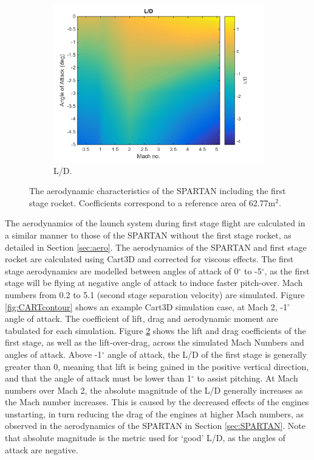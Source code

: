 \begin{figure}[ht]
\begin{subfigure}{.5\textwidth}
    		\centering
    		\includegraphics[width=0.99\linewidth]{figures/3_vehicle_design/FirstStageLD}
    		\caption{L/D.}
    		\label{fig:LD-EFirstStage}
    	\end{subfigure}
    	\caption{The aerodynamic characteristics of the SPARTAN including the first stage rocket.  Coefficients correspond to a reference area of 62.77m$^2$.}
    	\label{fig:FirstStageAero}
    \end{figure}
  The aerodynamics of the launch system during first stage flight are calculated in a similar manner to those of the SPARTAN without the first stage rocket, as detailed in Section \ref{sec:aero}. 
  The aerodynamics of the SPARTAN and first stage rocket are calculated using Cart3D and corrected for viscous effects. The first stage aerodynamics are modelled between angles of attack of 0$^\circ$ to -5$^\circ$, as the first stage will be flying at negative angle of attack to induce faster pitch-over. Mach numbers from 0.2 to 5.1 (second stage separation velocity) are simulated. Figure \ref{fig:CARTcontour} shows an example Cart3D simulation case, at Mach 2, -1$^\circ$ angle of attack. The coefficient of lift, drag and aerodynamic moment are tabulated for each simulation. Figure \ref{fig:FirstStageAero} shows the lift and drag coefficients of the first stage, as well as the lift-over-drag, across the simulated Mach Numbers and angles of attack. Above -1$^\circ$ angle of attack, the L/D of the first stage is generally greater than 0, meaning that lift is being gained in the positive vertical direction, and that the angle of attack must be lower than 1$^\circ$ to assist pitching.
  At Mach numbers over Mach 2, the absolute magnitude of the L/D generally increases as the Mach number increases. This is caused by the decreased effects of the engines unstarting, in turn reducing the drag of the engines at higher Mach numbers, as observed in the aerodynamics of the SPARTAN in Section \ref{sec:SPARTAN}. 
   Note that absolute magnitude is the metric used for `good' L/D, as the angles of attack are negative. 
  

